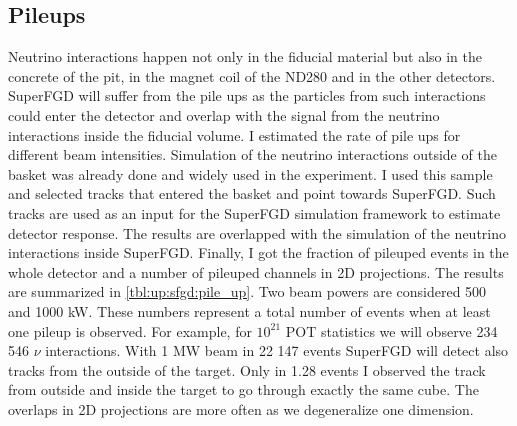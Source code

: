 \documentclass[main.tex]{subfiles}
\begin{document}
\subsection{Pileups}
\label{sec:up:sfgd:pu}
Neutrino interactions happen not only in the fiducial material but also in the concrete of the pit, in the magnet coil of the ND280 and in the other detectors. SuperFGD will suffer from the pile ups as the particles from such interactions could enter the detector and overlap with the signal from the neutrino interactions inside the fiducial volume. I estimated the rate of pile ups for different beam intensities. Simulation of the neutrino interactions outside of the basket was already done and widely used in the experiment. I used this sample and selected tracks that entered the basket and point towards SuperFGD. Such tracks are used as an input for the SuperFGD simulation framework to estimate detector response. The results are overlapped with the simulation of the neutrino interactions inside SuperFGD. Finally, I got the fraction of pileuped events in the whole detector and a number of pileuped channels in 2D projections. The results are summarized in \autoref{tbl:up:sfgd:pile_up}. Two beam powers are considered 500 and 1000 kW. These numbers represent a total number of events when at least one pileup is observed. For example, for $10^{21}$ POT statistics we will observe 234 546 $\nu$ interactions. With 1 MW beam in 22 147 events SuperFGD will detect also tracks from the outside of the target. Only in 1.28 events I observed the track from outside and inside the target to go through exactly the same cube. The overlaps in 2D projections are more often as we degeneralize one dimension.
\end{document}
